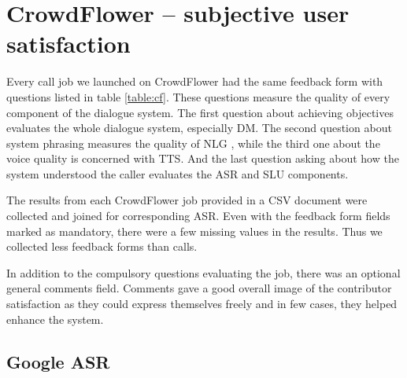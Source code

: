 \section{CrowdFlower -- subjective user satisfaction}

Every call job we launched on CrowdFlower had the same feedback form with questions listed in table \ref{table:cf}.
These questions measure the quality of every component of the dialogue system.
The first question about achieving objectives evaluates the whole dialogue system, especially \ac{DM}.
The second question about system phrasing measures the quality of \ac{NLG} , while the third one about the voice quality is concerned with \ac{TTS}.
And the last question asking about how the system understood the caller evaluates the \ac{ASR} and \ac{SLU} components.


\begin{table}[h]
\centering
\hspace*{-3pt}
\caption[CrowdFlower feedback form questions]{CrowdFlower feedback form questions with choice ranges.}
\label{table:cf}
\end{table}

The results from each CrowdFlower job provided in a \ac{CSV} document were collected and joined for corresponding \ac{ASR}.
Even with the feedback form fields marked as mandatory, there were a few missing values in the results.
Thus we collected less feedback forms than calls.

In addition to the compulsory questions evaluating the job, there was an optional general comments field.
Comments gave a good overall image of the contributor satisfaction as they could express themselves freely and in few cases, they helped enhance the system.

\subsection{Google ASR}

